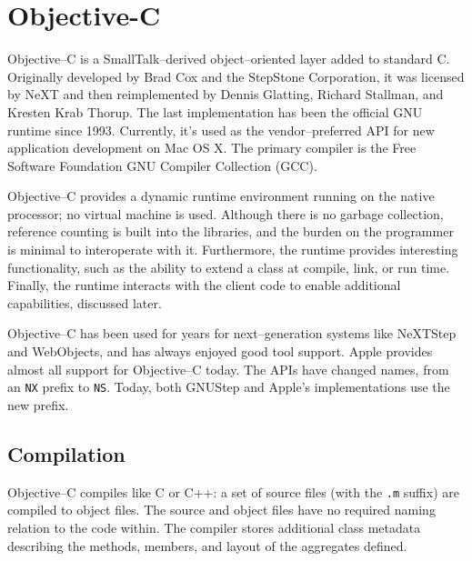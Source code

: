 \section{Objective-C}
	Objective--C\cite{objc} is a SmallTalk--derived object--oriented layer added to standard C.  Originally developed by Brad Cox and the StepStone Corporation\cite{dekorte}, it was licensed by NeXT and then reimplemented by Dennis Glatting, Richard Stallman, and Kresten Krab Thorup.  The last implementation has been the official GNU runtime since 1993\cite{dekorte}.  Currently, it's used as the vendor--preferred API for new application development on Mac OS X.  The primary compiler is the Free Software Foundation GNU Compiler Collection (GCC).

	Objective--C provides a dynamic runtime environment running on the native processor; no virtual machine is used.  Although there is no garbage collection, reference counting is built into the libraries, and the burden on the programmer is minimal to interoperate with it.  Furthermore, the runtime provides interesting functionality, such as the ability to extend a class at compile, link, or run time.  Finally, the runtime interacts with the client code to enable additional capabilities, discussed later.

	Objective--C has been used for years for next--generation systems like NeXTStep and WebObjects, and has always enjoyed good tool support.  Apple provides almost all support for Objective--C today.  The APIs have changed names, from an \texttt{NX} prefix to \texttt{NS}.  Today, both GNUStep\cite{gnustep} and Apple's implementations use the new prefix.

\subsection{Compilation}	

	Objective--C compiles like C or C++: a set of source files (with the \texttt{.m} suffix) are compiled to object files.  The source and object files have no required naming relation to the code within.  The compiler stores additional class metadata describing the methods, members, and layout of the aggregates defined.

